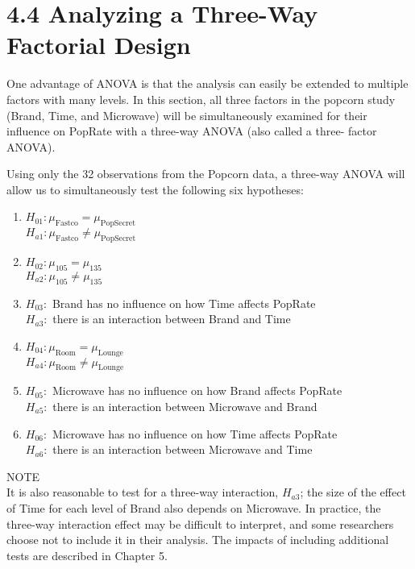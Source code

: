 \documentclass[
]{report}
\providecommand{\tightlist}{%
  \setlength{\itemsep}{0pt}\setlength{\parskip}{0pt}}
\begin{document}
\section{4.4 Analyzing a Three-Way Factorial Design}\label{analyzing-a-three-way-factorial-design}

One advantage of ANOVA is that the analysis can easily be extended to multiple factors with many levels. In this section, all three factors in the popcorn study (Brand, Time, and Microwave) will be simultaneously examined for their influence on PopRate with a three-way ANOVA (also called a three-
factor ANOVA).

Using only the 32 observations from the Popcorn data, a three-way ANOVA will allow us to simultaneously test the following six hypotheses:

\begin{enumerate}
\def\labelenumi{\arabic{enumi}.}
\tightlist
\item
  \(H_{01}: \mu_{\text{Fastco}} = \mu_{\text{PopSecret}}\)\\
  \(H_{a1}: \mu_{\text{Fastco}} \neq \mu_{\text{PopSecret}}\)\\
\item
  \(H_{02}: \mu_{105} = \mu_{135}\)\\
  \(H_{a2}: \mu_{105} \neq \mu_{135}\)\\
\item
  \(H_{03}:\) Brand has no influence on how Time affects PopRate\\
  \(H_{a3}:\) there is an interaction between Brand and Time\\
\item
  \(H_{04}: \mu_{\text{Room}} = \mu_{\text{Lounge}}\)\\
  \(H_{a4}: \mu_{\text{Room}} \neq \mu_{\text{Lounge}}\)\\
\item
  \(H_{05}:\) Microwave has no influence on how Brand affects PopRate\\
  \(H_{a5}:\) there is an interaction between Microwave and Brand\\
\item
  \(H_{06}:\) Microwave has no influence on how Time affects PopRate\\
  \(H_{a6}:\) there is an interaction between Microwave and Time
\end{enumerate}

NOTE\\
It is also reasonable to test for a three-way interaction, \(H_{a3}\); the size of the effect of Time for each level of Brand also depends on Microwave. In practice, the three-way interaction effect may be difficult to interpret, and some researchers choose not to include it in their analysis. The impacts of including additional tests are described in Chapter 5.
\end{document}
